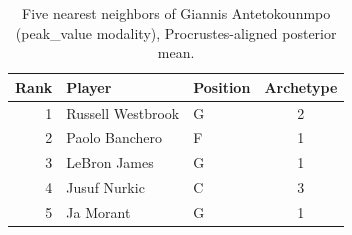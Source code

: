 \begin{table}[htbp]
  \centering\small
  \begin{tabular}{rllc}
    \toprule
    Rank & Player & Position & Archetype \\
    \midrule
    1 & Russell Westbrook & G & 2 \\
    2 & Paolo Banchero & F & 1 \\
    3 & LeBron James & G & 1 \\
    4 & Jusuf Nurkic & C & 3 \\
    5 & Ja Morant & G & 1 \\
    \bottomrule
  \end{tabular}
  \caption{Five nearest neighbors of Giannis Antetokounmpo (peak_value modality), Procrustes-aligned posterior mean.}
  \label{tab:Giannis_Antetokounmpo_neighbors_peak_value}
\end{table}

